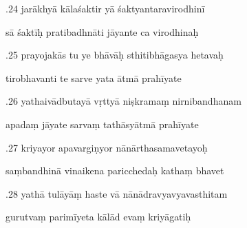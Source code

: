 \documentclass[article,12pt,a4paper]{memoir}%
\newcounter{parCount}
\begin{document}
	  
	  \pstart {}.24 jarākhyā kālaśaktir yā śaktyantaravirodhinī 
	{}
	\pend%
      

	  
	  \pstart \leavevmode%
	sā śaktīḥ pratibadhnāti jāyante ca virodhinaḥ 
	{}
	\pend%
      

	  
	  \pstart {}.25 prayojakās tu ye bhāvāḥ sthitibhāgasya hetavaḥ 
	{}
	\pend%
      

	  
	  \pstart \leavevmode%
	tirobhavanti te sarve yata ātmā prahīyate 
	{}
	\pend%
      

	  
	  \pstart {}.26 yathaivādbutayā vṛttyā niṣkramaṃ nirnibandhanam 
	{}
	\pend%
      

	  
	  \pstart \leavevmode%
	apadaṃ jāyate sarvaṃ tathāsyātmā prahīyate 
	{}
	\pend%
      

	  
	  \pstart {}.27 kriyayor apavargiṇyor nānārthasamavetayoḥ 
	{}
	\pend%
      

	  
	  \pstart \leavevmode%
	saṃbandhinā vinaikena paricchedaḥ kathaṃ bhavet 
	{}
	\pend%
      

	  
	  \pstart {}.28 yathā tulāyāṃ haste vā   nānādravyavyavasthitam 
	{}
	\pend%
      

	  
	  \pstart \leavevmode%
	gurutvaṃ parimīyeta kālād evaṃ kriyāgatiḥ 
	{}
	\pend%
      
\end{document}
